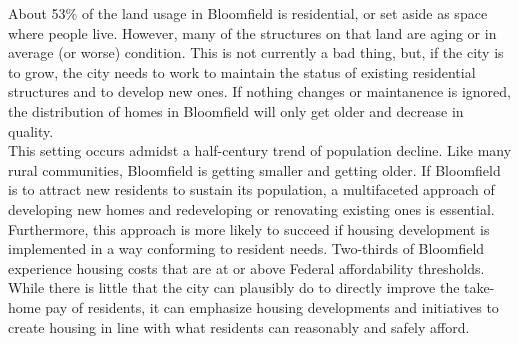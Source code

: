\noindent About 53\% of the land usage in Bloomfield is residential, or set aside as space where people live. However, many of the structures on that land are aging or in average (or worse) condition. This is not currently a bad thing, but, if the city is to grow, the city needs to work to maintain the status of existing residential structures and to develop new ones. If nothing changes or maintanence is ignored, the distribution of homes in Bloomfield will only get older and decrease in quality.\\

\noindent This setting occurs admidst a half-century trend of population decline. Like many rural communities, Bloomfield is getting smaller and getting older. If Bloomfield is to attract new residents to sustain its population, a multifaceted approach of developing new homes and redeveloping  or renovating existing ones is essential.\\

\noindent Furthermore, this approach is more likely to succeed if housing development is implemented in a way conforming to resident needs. Two-thirds of Bloomfield experience housing costs that are at or above Federal affordability thresholds. While there is little that the city can plausibly do to directly improve the take-home pay of residents, it can emphasize housing developments and initiatives to create housing in line with what residents can reasonably and safely afford.